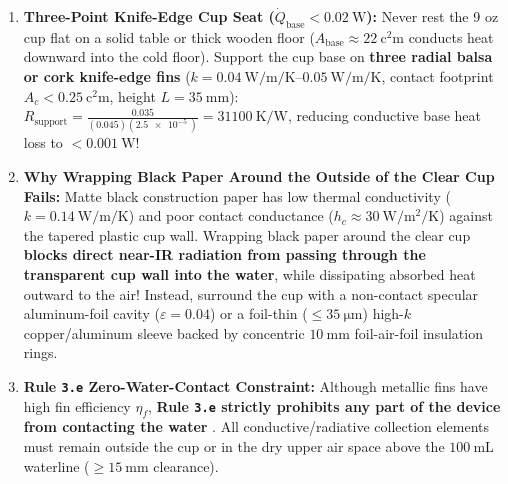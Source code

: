 \begin{devicebox}
\begin{enumerate}
  \item \textbf{Three-Point Knife-Edge Cup Seat ($\dot{Q}_{\mathrm{base}} < \SI{0.02}{\watt}$):} Never rest the 9 oz cup flat on a solid table or thick wooden floor ($A_{\mathrm{base}} \approx \SI{22}{\square\centi\meter}$ conducts heat downward into the cold floor). Support the cup base on \textbf{three radial balsa or cork knife-edge fins} ($k = \SIrange{0.04}{0.05}{\watt\per\meter\per\kelvin}$, contact footprint $A_c < \SI{0.25}{\square\centi\meter}$, height $L = \SI{35}{\milli\meter}$): $R_{\mathrm{support}} = \frac{0.035}{(0.045)(\SI{2.5e-5}{})} = \SI{31100}{\kelvin\per\watt}$, reducing conductive base heat loss to $<\SI{0.001}{\watt}$!
  \item \textbf{Why Wrapping Black Paper Around the Outside of the Clear Cup Fails:} Matte black construction paper has low thermal conductivity ($k = \SI{0.14}{\watt\per\meter\per\kelvin}$) and poor contact conductance ($h_c \approx \SI{30}{\watt\per\square\meter\per\kelvin}$) against the tapered plastic cup wall. Wrapping black paper around the clear cup \textbf{blocks direct near-IR radiation from passing through the transparent cup wall into the water}, while dissipating absorbed heat outward to the air! Instead, surround the cup with a non-contact specular aluminum-foil cavity ($\varepsilon = 0.04$) or a foil-thin ($\le\SI{35}{\micro\meter}$) high-$k$ copper/aluminum sleeve backed by concentric $\SI{10}{\milli\meter}$ foil-air-foil insulation rings.
  \item \textbf{Rule \texttt{3.e} Zero-Water-Contact Constraint:} Although metallic fins have high fin efficiency $\eta_f$, \textbf{Rule \texttt{3.e} strictly prohibits any part of the device from contacting the water} . All conductive/radiative collection elements must remain outside the cup or in the dry upper air space above the $\SI{100}{\milli\liter}$ waterline ($\ge\SI{15}{\milli\meter}$ clearance).
\end{enumerate}
\end{devicebox}

